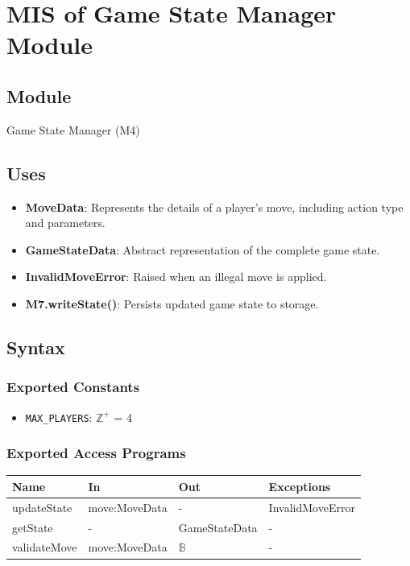 \documentclass[12pt, titlepage]{article}
\begin{document}

\section{MIS of Game State Manager Module} \label{M4}

\subsection{Module}
Game State Manager (M4)

\subsection{Uses}

\begin{itemize}
    \item \textbf{MoveData}: Represents the details of a player's move, including action type and parameters.
    \item \textbf{GameStateData}: Abstract representation of the complete game state.
    \item \textbf{InvalidMoveError}: Raised when an illegal move is applied.
    \item \textbf{M7.writeState()}: Persists updated game state to storage.
\end{itemize}

\subsection{Syntax}

\subsubsection{Exported Constants}
\begin{itemize}
\item \texttt{MAX\_PLAYERS}: $\mathbb{Z}^{+}$ = 4
\end{itemize}

\subsubsection{Exported Access Programs}
\begin{center}
\begin{tabular}{p{5cm} p{4cm} p{4cm} p{3cm}}
\hline
\textbf{Name} & \textbf{In} & \textbf{Out} & \textbf{Exceptions} \\
\hline
updateState & move:MoveData & - & InvalidMoveError \\
getState & - & GameStateData & - \\
validateMove & move:MoveData & $\mathbb{B}$ & - \\
\hline
\end{tabular}
\end{center}
\end{document}
